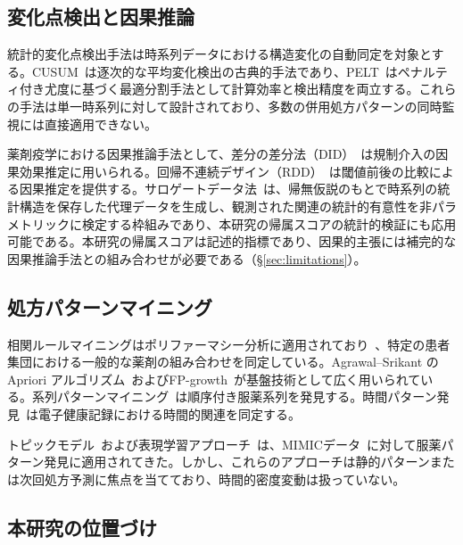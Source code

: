 \documentclass[11pt]{article}
\begin{document}
\subsection{変化点検出と因果推論}

統計的変化点検出手法は時系列データにおける構造変化の自動同定を対象とする。CUSUM~\citep{page1954cusum}は逐次的な平均変化検出の古典的手法であり、PELT~\citep{killick2012pelt}はペナルティ付き尤度に基づく最適分割手法として計算効率と検出精度を両立する。これらの手法は単一時系列に対して設計されており、多数の併用処方パターンの同時監視には直接適用できない。

薬剤疫学における因果推論手法として、差分の差分法（DID）~\citep{dimick2014did}は規制介入の因果効果推定に用いられる。回帰不連続デザイン（RDD）~\citep{bor2014rdd}は閾値前後の比較による因果推定を提供する。サロゲートデータ法~\citep{lancaster2018surrogate}は、帰無仮説のもとで時系列の統計構造を保存した代理データを生成し、観測された関連の統計的有意性を非パラメトリックに検定する枠組みであり、本研究の帰属スコアの統計的検証にも応用可能である。本研究の帰属スコアは記述的指標であり、因果的主張には補完的な因果推論手法との組み合わせが必要である（\S\ref{sec:limitations}）。

\subsection{処方パターンマイニング}

相関ルールマイニングはポリファーマシー分析に適用されており~\citep{carvalho2022apriori,pappa2017polypharmacy,doherty2020polypharmacy}、特定の患者集団における一般的な薬剤の組み合わせを同定している。Agrawal--Srikant の Apriori アルゴリズム~\citep{agrawal1994apriori}およびFP-growth~\citep{han2000fpgrowth}が基盤技術として広く用いられている。系列パターンマイニング~\citep{wright2015sequential}は順序付き服薬系列を発見する。時間パターン発見~\citep{noren2010temporal,batal2012temporal,landi2020temporal,alonso2023temporal}は電子健康記録における時間的関連を同定する。

トピックモデル~\citep{chen2017topic}および表現学習アプローチ~\citep{jensen2012ehr}は、MIMICデータ~\citep{johnson2023mimiciv,gupta2022pipeline}に対して服薬パターン発見に適用されてきた。しかし、これらのアプローチは静的パターンまたは次回処方予測に焦点を当てており、時間的密度変動は扱っていない。

\subsection{本研究の位置づけ}
\end{document}
